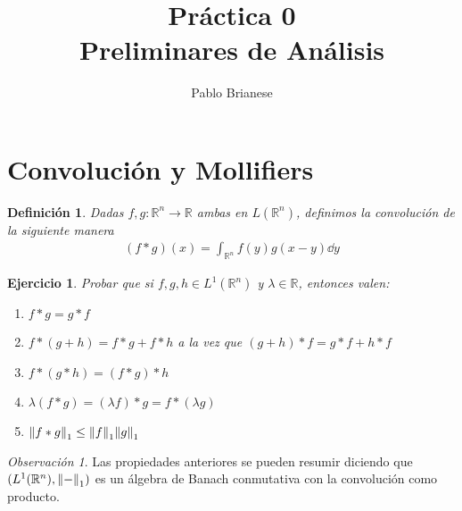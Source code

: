 \documentclass{article}
\title{Práctica 0 \\ Preliminares de Análisis}
\author{Pablo Brianese}
\newcommand{\placeholderParameter}{-}
\newcommand{\realNumbers}{\mathbb{R}}
\newtheorem{definition}{Definición}
\newtheorem{exercise}{Ejercicio}
\theoremstyle{remark}
\newtheorem{remark}{Observación}
\begin{document}
\maketitle
  \section{Convolución y Mollifiers}

  \begin{definition}
    Dadas \(f, g : \realNumbers^n \rightarrow \realNumbers\) ambas en \(L(\realNumbers^n)\), definimos la convolución de la siguiente manera
    \begin{align}
      (f * g) (x)
      =
      \int_{\realNumbers^n} f(y) g(x - y) \dd y
    \end{align}
  \end{definition}

  \begin{exercise}
    Probar que si \(f, g, h \in L^1(\realNumbers^n)\) y \(\lambda \in \realNumbers\), entonces valen:
    \begin{enumerate}
      \item 
        \label{exercise:convolutionConmutativity}
        \(f * g = g * f\)
      \item
        \label{exercise:convolutionDistributiveLaw}
        \(f * (g + h) = f * g + f * h\)
        a la vez que
        \((g + h) * f = g * f + h * f\)
      \item 
        \label{exercise:convolutionAsociativity}
        \(f * (g * h) = (f * g) * h\)
      \item 
        \label{exercise:convolutionScalarAsociativity}
        \(\lambda (f * g) 
        =
        (\lambda f) * g
        = 
        f * (\lambda g)\)
      \item
        \label{exercise:convolutionL1Bound}
        \(\norm{f * g}_1 
        \leq 
        \norm{f}_1 \norm{g}_1\)
    \end{enumerate}
  \end{exercise}

  \begin{remark}
    Las propiedades anteriores se pueden resumir diciendo que \((L^1(\realNumbers^n), \norm{\placeholderParameter}_1)\) es un álgebra de Banach conmutativa con la convolución como producto.
  \end{remark}
\end{document}
